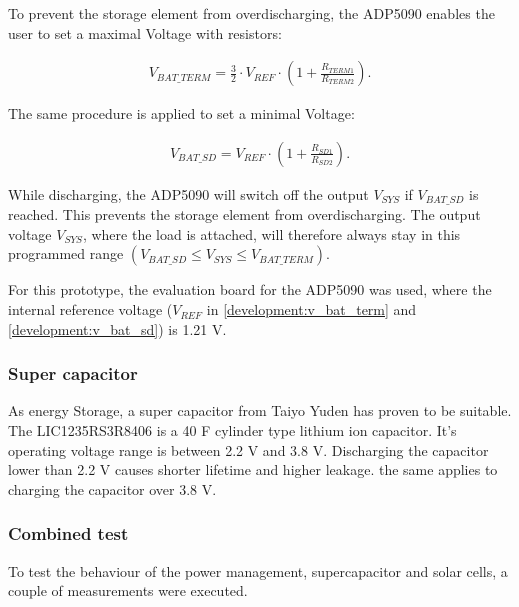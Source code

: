 To prevent the storage element from overdischarging, the ADP5090 enables the user to set a maximal Voltage with resistors:

\begin{align}
	V_{BAT\_TERM} = \frac{3}{2}\cdot V_{REF}\cdot\left(1+\frac{R_{TERM1}}{R_{TERM2}} \right).\label{development:v_bat_term} 
\end{align} 

The same procedure is applied to set a minimal Voltage:

\begin{align}
	V_{BAT\_SD}=V_{REF}\cdot \left(1+\frac{R_{SD1}}{R_{SD2}} \right).\label{development:v_bat_sd} 
\end{align}  

While discharging, the ADP5090 will switch off the output $V_{SYS}$ if $V_{BAT\_SD}$ is reached. This prevents the storage element from overdischarging.
The output voltage $V_{SYS}$, where the load is attached, will therefore always stay in this programmed range $(V_{BAT\_SD}\le V_{SYS}\le V_{BAT\_TERM})$.
\cite{adp}

For this prototype, the evaluation board for the ADP5090 was used, where the internal reference voltage ($V_{REF}$ in \eqref{development:v_bat_term} and \eqref{development:v_bat_sd}) is 1.21 V. \cite{adp_eval}

\subsubsection{Super capacitor}
As energy Storage, a super capacitor from Taiyo Yuden has proven to be suitable.
The LIC1235RS3R8406 is a 40 F cylinder type lithium ion capacitor.
It's operating voltage range is between 2.2 V and 3.8 V.
Discharging the capacitor lower than 2.2 V causes shorter lifetime and higher leakage.
the same applies to charging the capacitor over 3.8 V.
\cites{yuden}

\subsubsection{Combined test}
To test the behaviour of the power management, supercapacitor and solar cells, a couple of measurements were executed.

